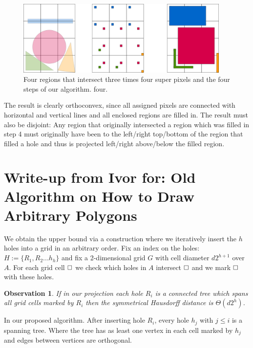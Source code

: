 \documentclass[a4paper, UKenglish]{lipics-v2018}
\newtheorem{observation}{Observation}
\newcommand{\pix}{\square}
\begin{document}
\begin{figure}[H]
\centering
\includegraphics[width=400px]{Figures/convexprojection.png}
\caption{Four regions that intersect three times four super pixels and the four steps of our algorithm. four.}
\label{fig:convexprojection}
\end{figure}

The result is clearly orthoconvex, since all assigned pixels are connected with horizontal and vertical lines and all enclosed regions are filled in. The result must also be disjoint: Any region that originally intersected a region which was filled in step 4 must originally have been to the left/right top/bottom of the region that filled a hole and thus is projected left/right above/below the filled region.



\section{Write-up from Ivor for: Old Algorithm on How to Draw Arbitrary Polygons}



We obtain the upper bound via a construction where we iteratively insert the $h$ holes into a grid in an arbitrary order.
Fix an index on the holes: $H := \{ R_1, R_2 ... h_h \}$ and fix a 2-dimensional grid $G$ with cell diameter $ d 2^{h+1}$ over $A$.
For each grid cell $\hfill\pix$ we check which holes in $A$ intersect $\hfill\pix$ and we mark $\hfill\pix$ with these holes.

\begin{observation}
If in our projection each hole $R_i$ is a connected tree which spans all grid cells marked by $R_i$ then the symmetrical Hausdorff distance is $\Theta(d2^h)$.
\end{observation}

\begin{definition}
In our proposed algorithm. After inserting hole $R_i$, every hole $h_j$ with $j \le i$ is a spanning tree. Where the tree has as least one vertex in each cell marked by $h_j$ and edges between vertices are orthogonal.
\end{definition}
\end{document}
